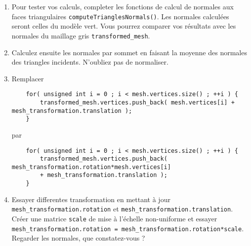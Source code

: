 \documentclass[a4paper,10pt]{tp_um}
\newcommand\code[1]{\texttt{#1}}
\begin{document}
\begin{enumerate}
\item Pour tester vos calculs, completer les fonctions de calcul de normales aux faces triangulaires \code{computeTrianglesNormals()}. Les normales calculées seront celles du modèle vert. Vous pourrez comparer vos résultats avec les normales du maillage gris \code{transformed_mesh}. 
\item Calculez ensuite les normales par sommet en faisant la moyenne des normales des triangles incidents. N'oubliez pas de normaliser.
\item Remplacer 
\begin{verbatim}
    for( unsigned int i = 0 ; i < mesh.vertices.size() ; ++i ) {
        transformed_mesh.vertices.push_back( mesh.vertices[i] + mesh_transformation.translation );
    }
\end{verbatim}
par 
\begin{verbatim}
    for( unsigned int i = 0 ; i < mesh.vertices.size() ; ++i ) {
        transformed_mesh.vertices.push_back( mesh_transformation.rotation*mesh.vertices[i] 
        + mesh_transformation.translation );
    }
\end{verbatim}

\item Essayer differentes transformation en mettant à jour  \code{mesh_transformation.rotation} et \code{mesh_transformation.translation}. 
Créer une matrice \code{scale} de mise à l'échelle non-uniforme et essayer \code{mesh_transformation.rotation = mesh_transformation.rotation*scale}. Regarder les normales, que constatez-vous ?

\end{enumerate}


\end{document}
